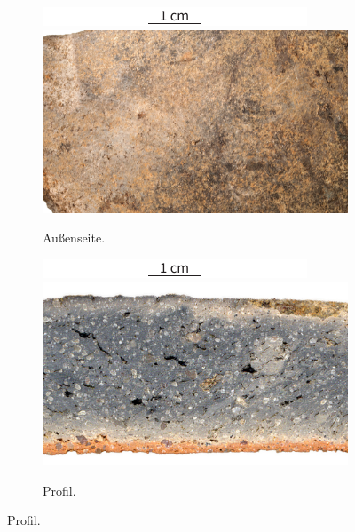 \begin{figure}[!tb]
	\centering
	\begin{subfigure}[t]{.32\textwidth}
		\centering
		\includegraphics[width = \textwidth, page = 1]{tbl/Tab_Fabrics/x_fabrics_scales.pdf}
		\includegraphics[width = \textwidth]{tbl/Tab_Fabrics/PIK87-2-6-77_outer_5cm.jpg}
		\caption{Außenseite.}
		\label{fig:PIK87-2-6-77_aussen}
	\end{subfigure}\hfill
	\begin{subfigure}[t]{.32\textwidth}
		\centering
		\includegraphics[width = \textwidth, page = 2]{tbl/Tab_Fabrics/x_fabrics_scales.pdf}
		\includegraphics[width = \textwidth]{tbl/Tab_Fabrics/PIK87-2-6-77_2cm.jpg}
		\caption{Profil.}
		\label{fig:PIK87-2-6-77_profil}

\end{subfigure}
\end{figure}
